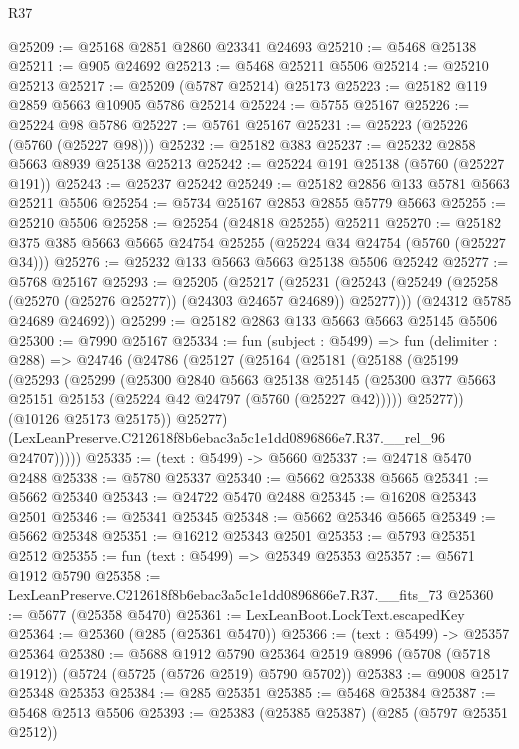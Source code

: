 \begin{lexlean}{R37}
\begin{coremodule}
@25209 := @25168 @2851 @2860 @23341 @24693
@25210 := @5468 @25138
@25211 := @905 @24692
@25213 := @5468 @25211 @5506
@25214 := @25210 @25213
@25217 := @25209 (@5787 @25214) @25173
@25223 := @25182 @119 @2859 @5663 @10905 @5786 @25214
@25224 := @5755 @25167
@25226 := @25224 @98 @5786
@25227 := @5761 @25167
@25231 := @25223 (@25226 (@5760 (@25227 @98)))
@25232 := @25182 @383
@25237 := @25232 @2858 @5663 @8939 @25138 @25213
@25242 := @25224 @191 @25138 (@5760 (@25227 @191))
@25243 := @25237 @25242
@25249 := @25182 @2856 @133 @5781 @5663 @25211 @5506
@25254 := @5734 @25167 @2853 @2855 @5779 @5663
@25255 := @25210 @5506
@25258 := @25254 (@24818 @25255) @25211
@25270 := @25182 @375 @385 @5663 @5665 @24754 @25255 (@25224 @34 @24754 (@5760 (@25227 @34)))
@25276 := @25232 @133 @5663 @5663 @25138 @5506 @25242
@25277 := @5768 @25167
@25293 := @25205
    (@25217
      (@25231 (@25243 (@25249 (@25258 (@25270 (@25276 @25277)) (@24303 @24657 @24689)) @25277)))
      (@24312 @5785 @24689 @24692))
@25299 := @25182 @2863 @133 @5663 @5663 @25145 @5506
@25300 := @7990 @25167
@25334 := fun (subject : @5499) =>
  fun (delimiter : @288) =>
  @24746
    (@24786
      (@25127
        (@25164
          (@25181
            (@25188
              (@25199
                (@25293
                  (@25299
                    (@25300
                      @2840
                      @5663
                      @25138
                      @25145
                      (@25300 @377 @5663 @25151 @25153 (@25224 @42 @24797 (@5760 (@25227 @42)))))
                    @25277))
                (@10126 @25173 @25175))
              @25277)
            (LexLeanPreserve.C212618f8b6ebac3a5c1e1dd0896866e7.R37.__rel_96 @24707)))))
@25335 := (text : @5499) -> @5660
@25337 := @24718 @5470 @2488
@25338 := @5780 @25337
@25340 := @5662 @25338 @5665
@25341 := @5662 @25340
@25343 := @24722 @5470 @2488
@25345 := @16208 @25343 @2501
@25346 := @25341 @25345
@25348 := @5662 @25346 @5665
@25349 := @5662 @25348
@25351 := @16212 @25343 @2501
@25353 := @5793 @25351 @2512
@25355 := fun (text : @5499) => @25349 @25353
@25357 := @5671 @1912 @5790
@25358 := LexLeanPreserve.C212618f8b6ebac3a5c1e1dd0896866e7.R37.__fits_73
@25360 := @5677 (@25358 @5470)
@25361 := LexLeanBoot.LockText.escapedKey
@25364 := @25360 (@285 (@25361 @5470))
@25366 := (text : @5499) -> @25357 @25364
@25380 := @5688
    @1912
    @5790
    @25364
    @2519
    @8996
    (@5708 (@5718 @1912))
    (@5724 (@5725 (@5726 @2519) @5790 @5702))
@25383 := @9008 @2517 @25348 @25353
@25384 := @285 @25351
@25385 := @5468 @25384
@25387 := @5468 @2513 @5506
@25393 := @25383 (@25385 @25387) (@285 (@5797 @25351 @2512))

\end{coremodule}
\end{lexlean}
